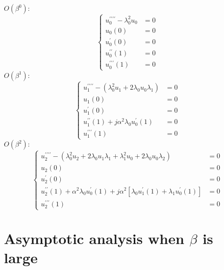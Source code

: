 \documentclass{article}
\begin{document}
\noindent
$O(\beta^0)$:
\begin{equation}
    \left\{\begin{aligned}
        u_0^{\prime\prime\prime\prime} - \lambda_0^2 u_0 &=0 \\
        u_0(0) &= 0 \\
        u^{\prime}_0(0) &= 0 \\
        u^{\prime\prime}_0(1) &= 0 \\
        u^{\prime\prime\prime}_0(1) &= 0 
    \end{aligned}\right.
\end{equation}
$O(\beta^1)$:
\begin{equation}
    \left\{\begin{aligned}
        u_1^{\prime\prime\prime\prime} - \left( \lambda_0^2 u_1 + 2 \lambda_0 u_0 \lambda_1 \right) &=0 \\
        u_1(0) &= 0 \\
        u^{\prime}_1(0) &= 0 \\
        u^{\prime\prime}_1(1) + j \alpha^2 \lambda_0 u_0^{\prime}(1) &= 0 \\
        u^{\prime\prime\prime}_1(1) &= 0 
    \end{aligned}\right.
\end{equation}
$O(\beta^2)$:
\begin{equation}
    \left\{\begin{aligned}
        u_2^{\prime\prime\prime\prime} - \left( \lambda_0^2 u_2 + 2 \lambda_0 u_1 \lambda_1 + \lambda_1^2 u_0 + 2 \lambda_0 u_0 \lambda_2 \right) &=0 \\
        u_2(0) &= 0 \\
        u^{\prime}_2(0) &= 0 \\
        u^{\prime\prime}_2(1) + \alpha^2 \lambda_0 u_0^{\prime}(1) + j \alpha^2 \left[ \lambda_0 u_1^{\prime}(1) + \lambda_1 u_0^{\prime}(1) \right] &= 0 \\
        u^{\prime\prime\prime}_2(1) &= 0 
    \end{aligned}\right.
\end{equation}


\section{Asymptotic analysis when $\beta$ is large}
\end{document}
